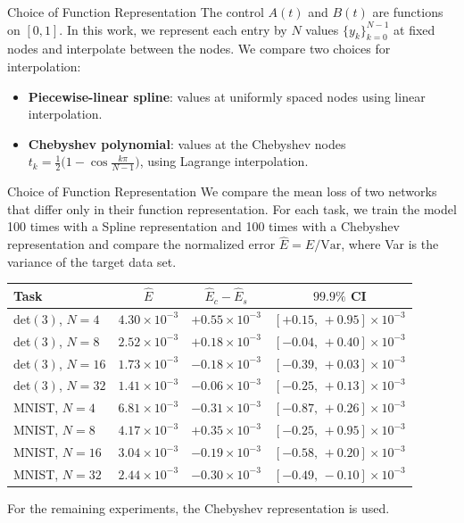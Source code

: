 \documentclass[aspectratio=169]{beamer}
\begin{document}

\begin{frame}{Choice of Function Representation}
The control $A(t)$ and $B(t)$ are functions on $[0,1]$. In this work, we represent each entry by $N$ values $\{y_k\}_{k=0}^{N-1}$ at fixed nodes and interpolate between the nodes. We compare two choices for interpolation:
\begin{itemize}
\item \textbf{Piecewise-linear spline}: values at uniformly spaced nodes using linear interpolation.
\item \textbf{Chebyshev polynomial}: values at the Chebyshev nodes $t_k = \tfrac{1}{2}\bigl(1 - \cos\tfrac{k\pi}{N-1}\bigr)$, using Lagrange interpolation.
\end{itemize}
\end{frame}


\begin{frame}{Choice of Function Representation}
We compare the mean loss of two networks that differ only in their function representation. For each task, we train the model 100 times with a Spline representation and 100 times with a Chebyshev representation and compare the normalized error $\hat E = E/\mathrm{Var}$, where Var is the variance of the target data set.

\begin{center}
\scriptsize\setlength{\tabcolsep}{8pt}\begin{tabular}{lccc}
\toprule
Task & $\hat E$ & $\hat E_c-\hat E_s$ & $99.9\%$ CI \\
\midrule
det$(3)$, $N{=}4$  & $4.30\times10^{-3}$ & $+0.55\times10^{-3}$ & $[+0.15,\,+0.95]\times10^{-3}$ \\
det$(3)$, $N{=}8$  & $2.52\times10^{-3}$ & $+0.18\times10^{-3}$ & $[-0.04,\,+0.40]\times10^{-3}$ \\
det$(3)$, $N{=}16$ & $1.73\times10^{-3}$ & $-0.18\times10^{-3}$ & $[-0.39,\,+0.03]\times10^{-3}$ \\
det$(3)$, $N{=}32$ & $1.41\times10^{-3}$ & $-0.06\times10^{-3}$ & $[-0.25,\,+0.13]\times10^{-3}$ \\
\midrule
MNIST, $N{=}4$  & $6.81\times10^{-3}$ & $-0.31\times10^{-3}$ & $[-0.87,\,+0.26]\times10^{-3}$ \\
MNIST, $N{=}8$  & $4.17\times10^{-3}$ & $+0.35\times10^{-3}$ & $[-0.25,\,+0.95]\times10^{-3}$ \\
MNIST, $N{=}16$ & $3.04\times10^{-3}$ & $-0.19\times10^{-3}$ & $[-0.58,\,+0.20]\times10^{-3}$ \\
MNIST, $N{=}32$ & $2.44\times10^{-3}$ & $-0.30\times10^{-3}$ & $[-0.49,\,-0.10]\times10^{-3}$ \\
\bottomrule
\end{tabular}
\end{center}

\medskip

For the remaining experiments, the Chebyshev representation is used.
\end{frame}
\end{document}
